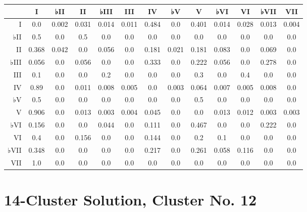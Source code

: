 \begin{table}[htbp]
\begin{minipage}{\linewidth}
\setlength{\tymax}{0.5\linewidth}
\centering
\small
\begin{tabulary}{\textwidth}{@{}RCCCCCCCCCCCC@{}} \toprule
&I&♭II&II&♭III&III&IV&♭V&V&♭VI&VI&♭VII&VII\\
\midrule
I&0.0&0.002&0.031&0.014&0.011&0.484&0.0&0.401&0.014&0.028&0.013&0.004\\
♭II&0.5&0.0&0.5&0.0&0.0&0.0&0.0&0.0&0.0&0.0&0.0&0.0\\
II&0.368&0.042&0.0&0.056&0.0&0.181&0.021&0.181&0.083&0.0&0.069&0.0\\
♭III&0.056&0.0&0.056&0.0&0.0&0.333&0.0&0.222&0.056&0.0&0.278&0.0\\
III&0.1&0.0&0.0&0.2&0.0&0.0&0.0&0.3&0.0&0.4&0.0&0.0\\
IV&0.89&0.0&0.011&0.008&0.005&0.0&0.003&0.064&0.007&0.005&0.008&0.0\\
♭V&0.5&0.0&0.0&0.0&0.0&0.0&0.0&0.5&0.0&0.0&0.0&0.0\\
V&0.906&0.0&0.013&0.003&0.004&0.045&0.0&0.0&0.013&0.012&0.003&0.003\\
♭VI&0.156&0.0&0.0&0.044&0.0&0.111&0.0&0.467&0.0&0.0&0.222&0.0\\
VI&0.4&0.0&0.156&0.0&0.0&0.144&0.0&0.2&0.1&0.0&0.0&0.0\\
♭VII&0.348&0.0&0.0&0.0&0.0&0.217&0.0&0.261&0.058&0.116&0.0&0.0\\
VII&1.0&0.0&0.0&0.0&0.0&0.0&0.0&0.0&0.0&0.0&0.0&0.0\\

\bottomrule

\end{tabulary}
\end{minipage}
\end{table}

\section{14-Cluster Solution, Cluster No. 12}
\label{14-clustersolutionclusterno.12}

